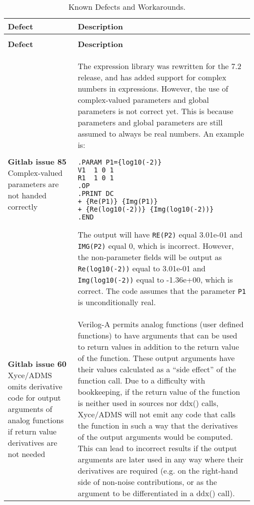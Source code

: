 {
\small

\begin{longtable}[h] {>{\raggedright\small}m{2in}|>{\raggedright\let\\\tabularnewline\small}m{3.5in}}
  \caption{Known Defects and Workarounds.} \\ \hline
  \rowcolor{XyceDarkBlue} \color{white}\textbf{Defect} & \color{white}\textbf{Description} \\ \hline \endfirsthead
  \caption[]{Known Defects and Workarounds.} \\ \hline
  \rowcolor{XyceDarkBlue} \color{white}\textbf{Defect} & \color{white}\textbf{Description}
  \\ \hline \endhead

%
%

\textbf{Gitlab issue 85} Complex-valued parameters are not handed correctly &
The \Xyce{} expression library was rewritten for the 7.2 release, and
has added support for complex numbers in expressions.  However, the
use of complex-valued parameters and global parameters is not correct yet. 
This is because parameters and global parameters are still assumed to
always be real numbers.
An example is:
\begin{verbatim}
.PARAM P1={log10(-2)}
V1  1 0 1
R1  1 0 1
.OP
.PRINT DC 
+ {Re(P1)} {Img(P1)} 
+ {Re(log10(-2))} {Img(log10(-2))}
.END
\end{verbatim}
The output will have \texttt{RE(P2)} equal 3.01e-01 and \texttt{IMG(P2)}
  equal 0, which is incorrect.  However,  the non-parameter fields will be
  output as \texttt{Re(log10(-2))} equal to
  3.01e-01 and \texttt{Img(log10(-2))} equal to -1.36e+00, which is correct.
  The code assumes that the parameter \texttt{P1} is unconditionally real.
\\ \hline

\textbf{Gitlab issue 60} Xyce/ADMS omits derivative code for output arguments of analog functions if return value derivatives are not needed &
Verilog-A permits analog functions (user defined functions) to have arguments that can be used to return values in addition to the return value of the function.  These output arguments have their values calculated as a ``side effect'' of the function call.  Due to a difficulty with bookkeeping, if the return value of the function is neither used in sources nor ddx() calls, Xyce/ADMS will not emit any code that calls the function in such a way that the derivatives of the output arguments would be computed.  This can lead to incorrect results if the output arguments are later used in any way where their derivatives are required (e.g. on the right-hand side of non-noise contributions, or as the argument to be differentiated in a ddx() call).


\end{longtable}}
